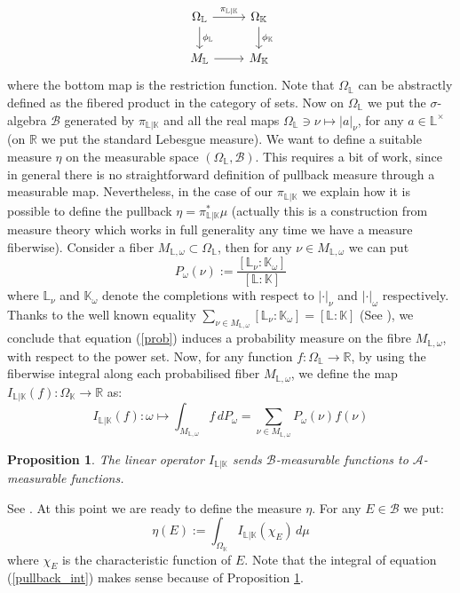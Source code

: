 \documentclass[10 pt,a4paper]{article}
\theoremstyle{plain}
\newtheorem{prop}[thm]{Proposition}
\theoremstyle{definition}
\theoremstyle{named}
\begin{document}
\begin{equation}\label{sqdiag}
\begin{tikzcd}
 \Omega_{\mathbb L}\arrow[r,"\pi_{\mathbb L|\mathbb K}"] \arrow[d,"\phi_{\mathbb L}"] & \Omega_{\mathbb K}\arrow[d,"\phi_{\mathbb K}"]\\
M_{\mathbb L}\arrow[r] & M_{\mathbb K}
\end{tikzcd}
\end{equation}
where the bottom map is the restriction function. Note that $\Omega_{\mathbb L}$ can be abstractly defined as the fibered product in the category of sets. Now on $\Omega_{\mathbb L}$ we put the $\sigma$-algebra $\mathcal B$ generated by $\pi_{\mathbb L|\mathbb K}$ and all the real maps $\Omega_{\mathbb L}\ni\nu\mapsto|a|_{\nu}$, for any $a\in\mathbb L^\times$ (on $\mathbb R$ we put the standard Lebesgue measure). We want to define a suitable measure $\eta$ on the measurable space $(\Omega_{\mathbb L},\mathcal B)$. This requires a bit of work, since in general there is no straightforward definition of pullback measure through a measurable map. Nevertheless, in the  case of our $\pi_{\mathbb L|\mathbb K}$ we explain how it is possible to define the pullback $\eta=\pi^\ast_{\mathbb L|\mathbb K}\mu$ (actually this is a  construction from measure theory which works in full generality any time we have a measure fiberwise).  Consider a fiber $M_{\mathbb L,\omega}\subset\Omega_{\mathbb L}$, then for any $\nu\in M_{\mathbb L,\omega}$ we can put
\begin{equation}\label{prob}
P_\omega(\nu):=\frac{[\mathbb L_\nu:\mathbb K_\omega]}{[\mathbb L:\mathbb K]}
\end{equation}
where $\mathbb L_\nu$ and $\mathbb K_\omega$ denote the completions with respect to $|\cdot|_\nu$ and $|\cdot|_\omega$ respectively. Thanks to the well known equality $\sum_{\nu\in M_{\mathbb L,\omega}}[\mathbb L_\nu:\mathbb K_\omega]=[\mathbb L:\mathbb K]$ (See \cite[Ch. II, Corollary 8.4]{Neu}), we conclude that equation (\ref{prob}) induces a probability measure on the fibre $M_{\mathbb L,\omega}$, with respect to the power set. Now, for any function $f:\Omega_{\mathbb L}\to\mathbb R$, by using the fiberwise integral along each probabilised fiber $M_{\mathbb L,\omega}$, we define the map $I_{\mathbb L|\mathbb K}(f):\Omega_\mathbb K\to\mathbb R$ as:
$$I_{\mathbb L|\mathbb K}(f):\omega\mapsto \int_{M_{\mathbb L,\omega}} \!\!f\,dP_\omega=\!\sum_{\nu\in M_{\mathbb L,\omega}}\!P_\omega(\nu)f(\nu)$$
\begin{prop}\label{fiber_int}
The linear operator $I_{\mathbb L|\mathbb K}$ sends $\mathcal B$-measurable functions to $\mathcal A$-measurable functions.
\end{prop}
\proof
See \cite[Theorem 3.3.4]{Ch-Mo}.
\endproof
At this point we are ready to define the measure $\eta$. For any $E\in\mathcal B$ we put:
\begin{equation}\label{pullback_int}
\eta(E):=\int_{\Omega_\mathbb K} I_{\mathbb L|\mathbb K}(\chi_{E})\, d\mu
\end{equation}
where $\chi_{E}$ is the characteristic function of $E$. Note that the integral of equation (\ref{pullback_int}) makes sense because of Proposition \ref{fiber_int}. 
\end{document}
